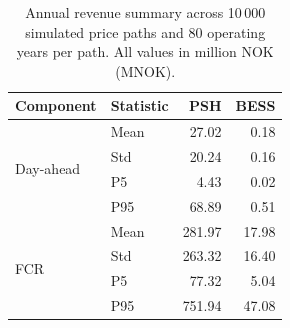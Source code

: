 \begin{table}[ht]
\centering
\caption{Annual revenue summary across 10\,000 simulated price paths and 80 operating years per path. All values in million NOK (MNOK).}
\label{tab:opt-revenue}
\begin{tabular}{llrr}
\toprule
Component & Statistic & PSH & BESS \\
\midrule
  \multirow{4}{*}{Day-ahead} & Mean & 27.02 & 0.18 \\
   & Std & 20.24 & 0.16 \\
   & P5 & 4.43 & 0.02 \\
   & P95 & 68.89 & 0.51 \\
  \midrule
  \multirow{4}{*}{FCR} & Mean & 281.97 & 17.98 \\
   & Std & 263.32 & 16.40 \\
   & P5 & 77.32 & 5.04 \\
   & P95 & 751.94 & 47.08 \\
\bottomrule
\end{tabular}
\end{table}
